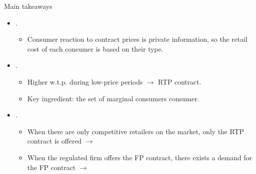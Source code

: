 \documentclass{class}
\begin{document}
\begin{frame}{Main takeaways}


\begin{itemize}

\item {}.

\vfill

\begin{itemize}
    \item Consumer reaction to contract prices is private information, so the retail cost of each consumer is based on their type.  
\end{itemize}


\vfill

\item {}.

\vfill

\begin{itemize} 
    \item Higher w.t.p. during low-price periods $\rightarrow$ RTP contract.
    \item Key ingredient: the set of marginal consumers consumer. 
\end{itemize}

\vfill

\item {}.

\vfill

\begin{itemize}
    \item When there are only competitive retailers on the market, only the RTP contract is offered $\rightarrow$ 
    \item When the regulated firm offers the FP contract, there exists a demand for the FP contract $\rightarrow$ 
\end{itemize}


 





\end{itemize}


\end{frame}
\end{document}
